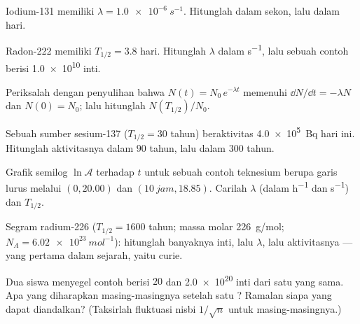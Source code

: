 \begin{exercise}[$\star$]\label{exo:g12:radioactive-decay:1}
Iodium-131 memiliki $\lambda = \qty{1.0e-6}{s^{-1}}$. Hitunglah  dalam
sekon, lalu dalam hari.
\end{exercise}

\begin{exercise}[$\star$]\label{exo:g12:radioactive-decay:2}
Radon-222 memiliki $T_{1/2} = 3.8$ hari. Hitunglah $\lambda$ dalam \unit{s^{-1}},
lalu  sebuah contoh berisi \num{1.0e10} inti.
\end{exercise}

\begin{exercise}[$\star$]\label{exo:g12:radioactive-decay:3}
Periksalah dengan penyulihan bahwa $N(t) = N_0\,e^{-\lambda t}$ memenuhi
$\dd N/\dd t = -\lambda N$ dan $N(0) = N_0$; lalu hitunglah $N(T_{1/2})/N_0$.
\end{exercise}

\begin{exercise}[$\star$]\label{exo:g12:radioactive-decay:4}
Sebuah sumber sesium-137 ($T_{1/2} = 30$ tahun) beraktivitas \qty{4.0e5}{Bq}
hari ini. Hitunglah aktivitasnya dalam $90$ tahun, lalu dalam $300$ tahun.
\end{exercise}

\begin{exercise}[$\star$]\label{exo:g12:radioactive-decay:5}
Grafik semilog $\ln \mathcal A$ terhadap $t$ untuk sebuah contoh teknesium berupa
garis lurus melalui $(0, 20.00)$ dan $(\qty{10}{jam}, 18.85)$. Carilah
$\lambda$ (dalam \unit{h^{-1}} dan \unit{s^{-1}}) dan $T_{1/2}$.
\end{exercise}

\begin{exercise}[$\star\star$]\label{exo:g12:radioactive-decay:6}
Segram radium-226 ($T_{1/2} = 1600$ tahun; massa molar
\qty{226}{g/mol}; $N_A = \qty{6.02e23}{mol^{-1}}$): hitunglah banyaknya
inti, lalu $\lambda$, lalu aktivitasnya ---   yang pertama dalam
sejarah, yaitu curie.
\end{exercise}

\begin{exercise}[$\star\star$]\label{exo:g12:radioactive-decay:7}
Dua siswa menyegel contoh berisi $20$ dan \num{2.0e20} inti dari satu
 yang sama. Apa yang diharapkan masing-masingnya setelah satu ? Ramalan
siapa yang dapat diandalkan? (Taksirlah fluktuasi nisbi $1/\sqrt n$ untuk masing-masingnya.)
\end{exercise}

